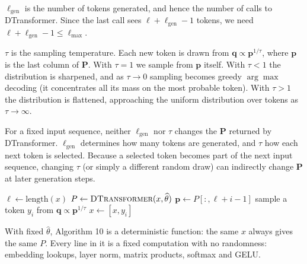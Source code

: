 \documentclass[12pt]{article}
\begin{document}
$\ell_{\text{gen}}$ is the number of tokens generated, and hence
the number of calls to DTransformer. Since the last call sees
$\ell + \ell_{\text{gen}} - 1$ tokens, we need
$\ell + \ell_{\text{gen}} - 1 \le \ell_{\max}$.

$\tau$ is the sampling temperature. Each new token is drawn from
$\symbf{q} \propto \symbf{p}^{1/\tau}$, where $\symbf{p}$ is the
last column of $\symbf{P}$. With $\tau = 1$ we sample from
$\symbf{p}$ itself. With $\tau < 1$ the distribution is sharpened,
and as $\tau \to 0$ sampling becomes greedy $\arg\max$ decoding
(it concentrates all its mass on the most probable token).
With $\tau > 1$ the distribution is flattened, approaching
the uniform distribution over tokens as $\tau \to \infty$.

For a fixed input sequence, neither \(\ell_{\text{gen}}\)
nor \(\tau\) changes the \(\symbf{P}\) returned by
DTransformer. $\ell_{\text{gen}}$ determines how many
tokens are generated, and $\tau$ how each next token
is selected. Because a selected token becomes part of the
next input sequence, changing \(\tau\) (or simply a
different random draw) can indirectly change
\(\symbf{P}\) at later generation steps.

\setcounter{algocf}{13}
\begin{algorithm}[H]
\caption{$y\leftarrow \textsc{DInference}(x,\widehat\theta)$}
\label{alg:dinference}
    \BlankLine
    $\ell\leftarrow\mathrm{length}(x)$\;
     {
        $P\leftarrow \textsc{DTransformer}(x, \widehat\theta)$ 
        $\symbf{p}\leftarrow P[:,\ell+i-1]$\;
        sample a token $y_i$ from $\symbf{q} \propto \symbf{p}^{1/\tau}$\;
        $x\leftarrow[x,y_i]$\;
    }
    \vspace*{2pt}
\end{algorithm}

With fixed $\widehat\theta$, Algorithm 10 is a deterministic
function: the same $x$ always gives the same $P$. Every
line in it is a fixed computation with no randomness:
embedding lookups, layer norm, matrix products, softmax and GELU.
\end{document}
